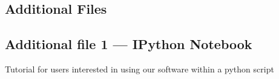 \documentclass{bmcart}
\begin{document}
\begin{backmatter}

\section*{Additional Files}
  \subsection*{Additional file 1 --- IPython Notebook}
    Tutorial for users interested in using our software within a python script


\end{backmatter}
\end{document}
